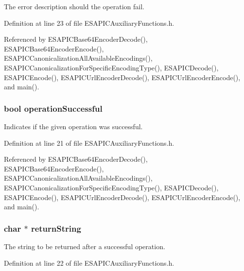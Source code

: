 The error description should the operation fail. 



Definition at line 23 of file ESAPICAuxiliaryFunctions.h.



Referenced by ESAPICBase64EncoderDecode(), ESAPICBase64EncoderEncode(), ESAPICCanonicalizationAllAvailableEncodings(), ESAPICCanonicalizationForSpecificEncodingType(), ESAPICDecode(), ESAPICEncode(), ESAPICUrlEncoderDecode(), ESAPICUrlEncoderEncode(), and main().

\hypertarget{a00002_a60d5c2a9f6ce8f351a24f7c3d816de5c}{
\subsubsection[{operationSuccessful}]{\setlength{\rightskip}{0pt plus 5cm}bool {\bf operationSuccessful}}}
\label{d7/d46/a00002_a60d5c2a9f6ce8f351a24f7c3d816de5c}


Indicates if the given operation was successful. 



Definition at line 21 of file ESAPICAuxiliaryFunctions.h.



Referenced by ESAPICBase64EncoderDecode(), ESAPICBase64EncoderEncode(), ESAPICCanonicalizationAllAvailableEncodings(), ESAPICCanonicalizationForSpecificEncodingType(), ESAPICDecode(), ESAPICEncode(), ESAPICUrlEncoderDecode(), ESAPICUrlEncoderEncode(), and main().

\hypertarget{a00002_ae335833c00b0feebd0ba7610cb1863a8}{
\subsubsection[{returnString}]{\setlength{\rightskip}{0pt plus 5cm}char $\ast$ {\bf returnString}}}
\label{d7/d46/a00002_ae335833c00b0feebd0ba7610cb1863a8}


The string to be returned after a successful operation. 



Definition at line 22 of file ESAPICAuxiliaryFunctions.h.




